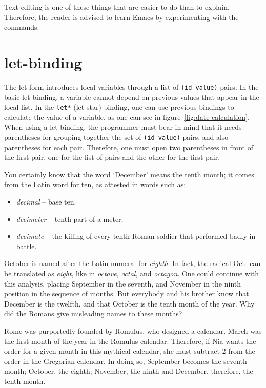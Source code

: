 \documentclass[a4paper,12pt]{book}
\begin{document}
Text editing is one of these things that are easier to do
than to explain. Therefore, the reader is advised to learn
Emacs by experimenting with the commands.

\section{let-binding}
The let-form introduces 
local variables
through a list of \verb|(id value)| 
pairs.
In the basic let-binding, a variable cannot 
depend on previous values that appear
in the local list. In the
\verb|let*| (let star) binding,
one can use previous bindings to calculate
the value of a variable, as one can see in
figure~\ref{fig:date-calculation}.
When using a let binding, the programmer must
bear in mind that it needs parentheses for
grouping together the set of \verb|(id value)| pairs,
and also parentheses for each pair. Therefore,
one must open two parentheses in front of the
first pair, one for the list of pairs and the
other for the first pair.


You certainly know that the word `December' means
the tenth month; it comes from the Latin word for
ten, as attested in words such as:
\begin{itemize}
	\item {\em decimal} -- base ten.
	\item {\em decimeter} -- tenth part of a meter.
	\item {\em decimate} -- the killing of every tenth
		Roman soldier that performed badly in battle.
\end{itemize}

October is named after the Latin numeral for {\em eighth}.
In fact, the radical {\sc Oct-} can be translated
as {\em eight}, like in
{\em octave}, {\em octal}, and {\em octagon}.
One could continue with this analysis,
placing September in the seventh,
and November in the ninth position
in the sequence of months.
But everybody and
his brother know that December is the
twelfth, and that
October is the tenth month of the
year. Why did the Romans give misleading
names to these months?

Rome was purportedly founded by Romulus,
who designed a calendar.
March was the first month of the year
in the Romulus calendar. Therefore, if Nia
wants the order for a given month in
this mythical calendar, she must
subtract 2 from the order
in the Gregorian calendar.
In doing so, September becomes the
seventh month; October, the eighth;
November, the ninth and
December, therefore, the tenth month.
\end{document}
